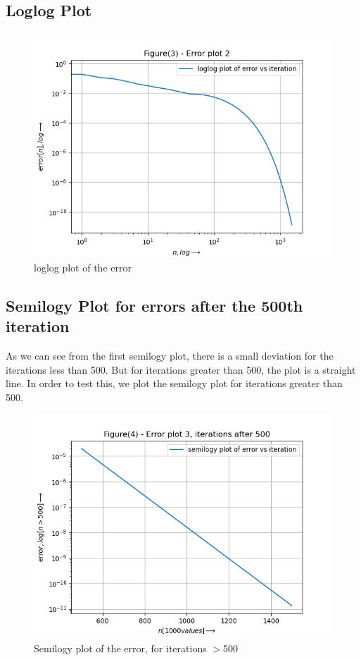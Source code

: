 \documentclass[11pt]{article}
\begin{document}
\subsection{Loglog Plot}
\begin{figure}[H]
    \centering
    \includegraphics[scale = 1]{Figure_3.png}
    \caption{loglog plot of the error}
\end{figure}

\subsection{Semilogy Plot for errors after the 500th iteration}

As we can see from the first semilogy plot, there is a small deviation for the iterations less than 500. But for iterations greater than 500, the plot is a straight line. In order to test this, we plot the semilogy plot for iterations greater than 500.

\begin{figure}[H]
    \centering
    \includegraphics[scale = 1]{Figure_4.png}
    \caption{Semilogy plot of the error, for iterations $>$500}
\end{figure}
\end{document}
